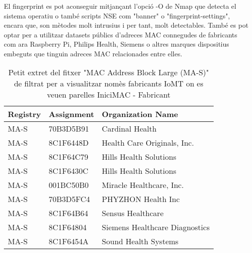 El fingerprint es pot aconseguir mitjançant l'opció -O de Nmap que detecta el sistema operatiu o també scripts NSE com "banner" o "fingerprint-settings", encara que, son mètodes molt intrusius i per tant, molt detectables. També es pot optar per a utilitzar datasets públics d'adreces MAC connegudes de fabricants com ara Raspberry Pi, Philips Health, Siemens o altres marques dispositius embeguts que tinguin adreces MAC relacionades entre elles.

\begin{table}[H]
\centering
\begin{tabular}{@{}lll@{}}
\toprule
\textbf{Registry} & \textbf{Assignment} & \textbf{Organization Name} \\
\midrule
MA-S & 70B3D5B91 & Cardinal Health \\
MA-S & 8C1F6448D & Health Care Originals, Inc. \\
MA-S & 8C1F64C79 & Hills Health Solutions \\
MA-S & 8C1F6430C & Hills Health Solutions \\
MA-S & 001BC50B0 & Miracle Healthcare, Inc. \\
MA-S & 70B3D5FC4 & PHYZHON Health Inc \\
MA-S & 8C1F64B64 & Sensus Healthcare \\
MA-S & 8C1F64804 & Siemens Healthcare Diagnostics \\
MA-S & 8C1F6454A & Sound Health Systems \\
\bottomrule
\end{tabular}
\caption{Petit extret del fitxer "MAC Address Block Large (MA-S)" de \cite{iotmaclist} filtrat per a visualitzar nomès fabricants IoMT on es veuen parelles IniciMAC - Fabricant}  %
\label{fig:iot_manufacturers}
\end{table}
